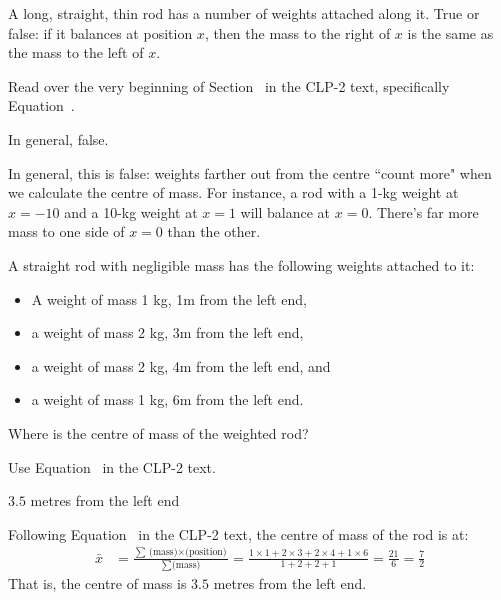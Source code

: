 \begin{Mquestion}
 A long, straight, thin rod has a number of weights attached along it. True or false: if it balances at  position $x$, then the mass to the right of $x$ is the same as the mass to the left of $x$.
\end{Mquestion}
\begin{hint}
Read over the very beginning of Section~ in the CLP-2 text, specifically Equation~.
\end{hint}
\begin{answer}
In general, false.
\end{answer}
\begin{solution}
In general, this is false: weights farther out from the centre ``count more" when we calculate the centre of mass. For instance, a rod with a 1-kg weight at $x=-10$ and a 10-kg weight at $x=1$ will balance at $x=0$. There's far more mass to one side of $x=0$ than the other.
\end{solution}
\begin{question}
A straight rod with negligible mass has the following weights attached to it:
\begin{itemize}
\item A weight of mass 1 kg, 1m from the left end,
\item a weight of mass 2 kg, 3m from the left end,
\item a weight of mass 2 kg, 4m from the left end, and
\item a weight of mass 1 kg, 6m from the left end.
\end{itemize}

Where is the centre of mass of the weighted rod?
\end{question}
\begin{hint}
Use Equation~ in the CLP-2 text.
\end{hint}
\begin{answer}
$3.5$ metres from the left end
\end{answer}
\begin{solution}
Following Equation~ in the CLP-2 text, the centre of mass of the rod is at:
\begin{align*}
\bar x &=\frac{\sum \text{(mass)$\times$(position)}}{\sum \text {(mass)}} = \frac{1\times 1 + 2\times 3 + 2\times 4 + 1 \times 6}{1+2+2+1}=\frac{21}{6}=\frac{7}{2}
\end{align*}
That is, the centre of mass is $3.5$ metres from the left end.
\end{solution}
